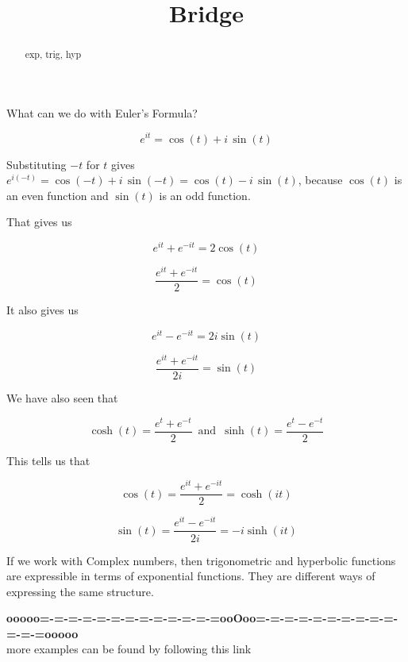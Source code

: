\documentclass{ximera}
\title{Bridge}
\begin{document}
\begin{abstract}
exp, trig, hyp
\end{abstract}
\maketitle





What can we do with Euler's Formula?



\[ e^{i t} = \cos(t) + i \, \sin(t) \]

Substituting $-t$ for $t$ gives $e^{i (-t)} = \cos(-t) + i \, \sin(-t) = \cos(t) - i \, \sin(t)$, because $\cos(t)$ is an even function and $\sin(t)$ is an odd function.



That gives us 

\[   e^{i t}  + e^{-i t} = 2 \cos(t)    \]


\[   \frac{e^{i t}  + e^{-i t}}{2} = \cos(t)    \]


It also gives us 



\[   e^{i t}  - e^{-i t} = 2 i \sin(t)    \]


\[   \frac{e^{i t}  + e^{-i t}}{2 i} = \sin(t)    \]





We have also seen that 


\[  \cosh(t)  = \frac{e^t + e^{-t}}{2}      \,   \text{ and } \,  \sinh(t)  = \frac{e^t - e^{-t}}{2}     \]



This tells us that 

\[  \cos(t) =  \frac{e^{i t} + e^{-i t}}{2} = \cosh(i t)      \]




\[  \sin(t) =  \frac{e^{i t} - e^{-i t}}{2 i} = -i \sinh(i t)      \]






If we work with Complex numbers, then trigonometric and hyperbolic functions are expressible in terms of exponential functions.  They are different ways of expressing the same structure.






















\begin{center}
\textbf{\textcolor{green!50!black}{ooooo=-=-=-=-=-=-=-=-=-=-=-=-=ooOoo=-=-=-=-=-=-=-=-=-=-=-=-=ooooo}} \\

more examples can be found by following this link\\ 

\end{center}
\end{document}
